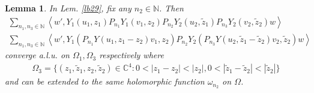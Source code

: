 \documentclass[11pt,b5paper,notitlepage]{article}
\theoremstyle{definition}
\theoremstyle{plain}
\newtheorem{lm}[df]{Lemma}
\newcommand{\wtd}{\widetilde}
\newcommand{\Cbb}{\mathbb C}
\newcommand{\Nbb}{\mathbb N}
\newcommand{\<}{\left\langle}
\renewcommand{\>}{\right\rangle}
\numberwithin{equation}{section}
\begin{document}
\begin{lm}\label{lb30}
In Lem. \ref{lb29}, fix any $n_2\in\Nbb$. Then
\begin{subequations}
\begin{gather}
\sum_{n_1,n_3\in\Nbb} \<w',Y_1(u_1,z_1)P_{n_1}Y_1(v_1,z_2)P_{n_2}Y_2(u_2, \wtd z_1)P_{n_3}Y_2(v_2,\wtd z_2)w\> \label{eq94}\\
\sum_{n_1,n_3\in\Nbb}\<w',Y_1(P_{n_1}Y(u_1,z_1-z_2)v_1,z_2)P_{n_2}Y_2(P_{n_3}Y(u_2,\wtd z_1-\wtd z_2)v_2,\wtd z_2)w\> \label{eq95}
\end{gather}
\end{subequations}
converge a.l.u. on $\Omega_1,\Omega_3$ respectively where
\begin{align}
\Omega_3=\{(z_1,\wtd z_1,z_2,\wtd z_2)\in\Cbb^4:0<|z_1-z_2|<|z_2|,0<|\wtd z_1-\wtd z_2|<|\wtd z_2|\}
\end{align}
and can be extended to the same holomorphic function $\omega_{n_2}$ on $\Omega$.
\end{lm}
\end{document}
